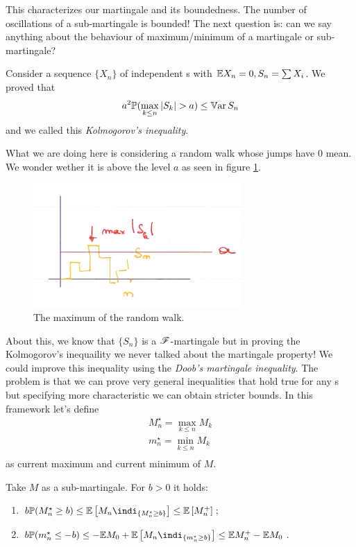 \documentclass{report}
\begin{document}
This characterizes our martingale and its boundedness. The number of oscillations of a sub-martingale is bounded! The next question is: can we say anything about the behaviour of maximum/minimum of a martingale or sub-martingale? 
\begin{remark}
	Consider a sequence $\{X_{n}\}$ of independent \rv s with $\mathbb{E} X_{n}=0,S_n=\sum X_{i}$. We proved that
	\begin{equation*}
		a^{2}\pr(\max_{k\leq n}|S_{k}|>a)\leq\var S_{n}
	\end{equation*}
	and we called this \emph{Kolmogorov's inequality}.
\end{remark}
What we are doing here is considering a random walk whose jumps have 0 mean. We wonder wether it is above the level $a$ as seen in figure \ref{fig:screenshot017}.
\begin{figure}[h]
	\centering
	\includegraphics[width=0.6\linewidth]{screenshot017}
	\caption{The maximum of the random walk.}
	\label{fig:screenshot017}
\end{figure}
About this, we know that $\{S_{n}\}$ is a $\mathscr{F}$-martingale but in proving the Kolmogorov's inequaility we never talked about the martingale property! We could improve this inequality using the \emph{Doob's martingale inequality}. The problem is that we can prove very general inequalities that hold true for any \rv s but specifying more characteristic we can obtain stricter bounds. In this framework let's define 
\begin{equation*}
	\begin{array}{l}
		M^{\star}_{n}=\max_{k\leq n}M_{k}\\
		m^{\star}_{n}=\min_{k\leq n}M_{k}\\
	\end{array}
\end{equation*}
as current maximum and current minimum of $M$.
\begin{theorem}
	Take $M$ as a sub-martingale. For $b>0$ it holds:
	\begin{enumerate}
		\item $b\pr(M^{\star}_{n}\geq b)\leq\ev\left[M_{n}\indi_{\{M_{n}^{\star}\geq b\}}\right]\leq\ev\left[M_{n}^{+}\right]$;
		\item $b\pr(m^{\star}_{n}\leq-b)\leq-\ev M_{0}+\ev\left[M_{n}\indi_{\{m_{n}^{\star}\geq b\}}\right]\leq\ev M_{n}^{+}-\ev M_{0}$.
	\end{enumerate}
\end{theorem}
\end{document}
